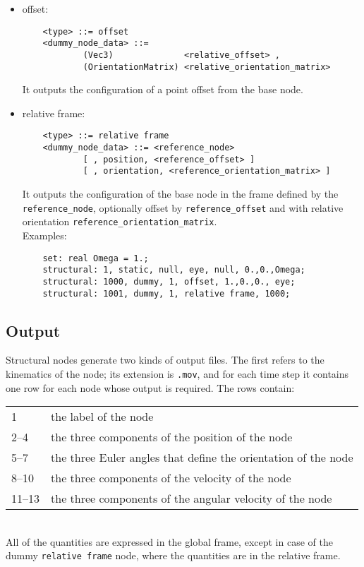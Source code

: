 \begin{itemize}

    \item offset:
    \begin{verbatim}
    <type> ::= offset
    <dummy_node_data> ::=
            (Vec3)              <relative_offset> ,
            (OrientationMatrix) <relative_orientation_matrix>
    \end{verbatim}
    It outputs the configuration of a point offset from the base node.
            
    \item relative frame:
    \begin{verbatim}
    <type> ::= relative frame
    <dummy_node_data> ::= <reference_node>
            [ , position, <reference_offset> ]
            [ , orientation, <reference_orientation_matrix> ]
    \end{verbatim}
    It outputs the configuration of the base node in the frame defined
    by the \texttt{reference\_node}, optionally offset 
    by \texttt{reference\_offset} and with relative orientation 
    \texttt{reference\_orientation\_matrix}.\\
    Examples:
    \begin{verbatim}
    set: real Omega = 1.;
    structural: 1, static, null, eye, null, 0.,0.,Omega;
    structural: 1000, dummy, 1, offset, 1.,0.,0., eye;
    structural: 1001, dummy, 1, relative frame, 1000;
    \end{verbatim}

\end{itemize}

\subsection{Output}
Structural nodes generate two kinds of output files. 
The first refers to the kinematics of the node; its extension is \texttt{.mov},
and for each time step it contains one row for each node whose output is
required.
The rows contain: \vspace{2mm} \\
\begin{tabular}{ll}
    \hline
    1      & the label of the node \\
    2--4   & the three components of the position of the node \\
    5--7   & the three Euler angles that define the orientation of the node \\
    8--10  & the three components of the velocity of the node \\
    11--13 & the three components of the angular velocity of the node \\
    \hline
\end{tabular}\vspace{2mm}\\
All of the quantities are expressed in the global frame, except in case of
the dummy \texttt{relative frame} node, where the quantities are in the
relative frame.

